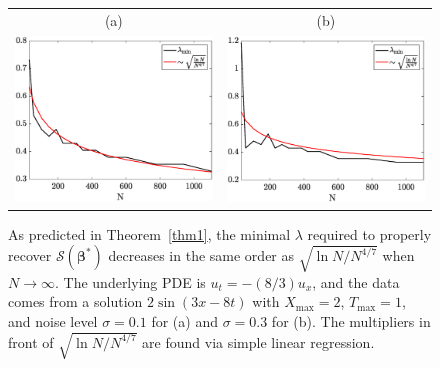 \documentclass[a4paper,11pt]{article}
\newcommand{\bbeta}{\bm{\beta}}
\newcommand{\mS}{\mathcal{S}}
\theoremstyle{definition}
\begin{document}
\begin{figure}
\centering
\begin{tabular}{cc}
(a)	& (b)\\
\includegraphics[scale=0.4]{Figures/transport_lambdaexp_0_3.eps}	&
\includegraphics[scale=0.4]{Figures/transport_lambdaexp_1.eps}
\end{tabular}
\caption{As predicted in Theorem~\ref{thm1}, the minimal $\lambda$ required to properly recover $\mS(\bbeta^*)$ decreases in the same order as $\sqrt{\ln N/N^{4/7}}$ when $N\to\infty$. The underlying PDE is $u_t=-(8/3)u_x$, and the data comes from a solution $2\sin(3x-8t)$ with $X_{\max}=2$, $T_{\max}=1$, and noise level $\sigma=0.1$ for (a) and $\sigma=0.3$ for (b). The multipliers in front of $\sqrt{\ln N/N^{4/7}}$ are found via simple linear regression.}\label{fig.advlambda}
\end{figure}
\end{document}
